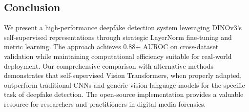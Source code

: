 \documentclass[11pt,a4paper]{article}
\begin{document}
\subsection{Conclusion}

We present a high-performance deepfake detection system leveraging DINOv3's self-supervised representations through strategic LayerNorm fine-tuning and metric learning. The approach achieves 0.88+ AUROC on cross-dataset validation while maintaining computational efficiency suitable for real-world deployment. Our comprehensive comparison with alternative methods demonstrates that self-supervised Vision Transformers, when properly adapted, outperform traditional CNNs and generic vision-language models for the specific task of deepfake detection. The open-source implementation provides a valuable resource for researchers and practitioners in digital media forensics.
\end{document}

